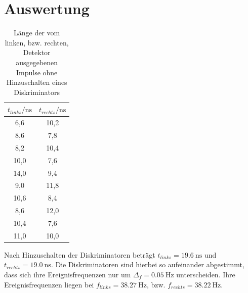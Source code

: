 \section{Auswertung}
\label{sec:Auswertung}

\begin{table}
  \caption{Länge der vom linken, bzw. rechten, Detektor ausgegebenen Impulse ohne Hinzuschalten eines Diskriminators}
  \label{tab:oD}
  \centering
  \begin{tabular}{|S|S|}
    \toprule
    $t_{links}/\si{\nano \second}$ & $t_{rechts}/\si{\nano \second}$\\
    ,6 & 10,2 \\
    8,6 & 7,8 \\
    8,2 & 10,4 \\
    10,0 & 7,6 \\
    14,0 & 9,4 \\
    9,0 & 11,8 \\
    10,6 & 8,4 \\
    8,6 & 12,0 \\
    10,4 & 7,6 \\
    11,0 & 10,0 \\
    \toprule
  \end{tabular}
\end{table}

Nach Hinzuschalten der Diskriminatoren beträgt $t_{links}= \SI{19,6}{\nano\second}$ und $t_{rechts} = \SI{19,0}{\nano \second}$. Die Diskriminatoren sind hierbei so aufeinander abgestimmt, dass sich ihre Ereignisfrequenzen nur um $\Delta_f = \SI{0,05}{\hertz}$ unterscheiden. Ihre Ereignisfrequenzen liegen bei $f_{links} = \SI{38.27}{\hertz}$, bzw. $f_{rechts}= \SI{38,22}{\hertz}$.

